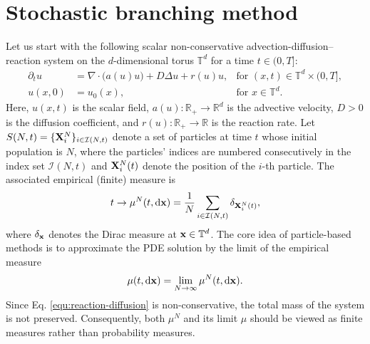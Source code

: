 \documentclass[a4paper,fleqn]{cas-sc}
\newcommand{\mhyphen}{\text{-}}
\theoremstyle{definition}
\theoremstyle{remark}
\begin{document}

\section{Stochastic branching method}
Let us start with the following scalar non-conservative advection-diffusion–reaction system on the $d$-dimensional torus $\mathbb{T}^d$ for a time $t \in (0, T]$:
\begin{subequations}\label{equ:reaction-diffusion}
\begin{align}
\partial_t u &= \nabla \!\cdot\! \big( a(u) u \big) + D \Delta u + r(u) u, & \text{for } (x, t) \in \mathbb{T}^d \times (0, T], \label{equ:pde} \\
u(x, 0) &= u_0(x), & \text{for } x \in \mathbb{T}^d. \label{equ:ic}
\end{align}
\end{subequations}
Here, $u(x,t)$ is the scalar field, $a(u): \mathbb{R}_{+} \to \mathbb{R}^d$ is the advective velocity, $D > 0$ is the diffusion coefficient, and $r(u): \mathbb{R}_{+} \to \mathbb{R}$ is the reaction rate.
Let $S(N,t)=\{\mathbf{X}^N_i\}_{i\in\mathcal I(N,t)}$ denote a set of particles at time $t$ whose initial population is $N$, where the particles' indices are numbered consecutively in the index set $\mathcal I(N,t)$ and $\mathbf{X}^N_i(t)$ denote the position of the $i\mhyphen$th particle. The associated empirical (finite) measure is
\begin{equation}
    t \to \mu^N(t,\mathrm{d} \mathbf{x}) =  \frac{1}{N}\sum_{i\in \mathcal I(N,t)}\delta_{\mathbf{X}^N_i(t)},
\end{equation}
where $\delta_{\mathbf{x}} $ denotes the Dirac measure at $\mathbf{x}\in \mathbb{T}^d$. The core idea of particle-based methods is to approximate the PDE solution by the limit of the empirical measure
\[
\mu(t,\mathrm{d}\mathbf{x}) = \lim_{N\to\infty} \mu^N(t,\mathrm{d}\mathbf{x}).
\]
Since Eq. \eqref{equ:reaction-diffusion} is non-conservative, the total mass of the system is not preserved. Consequently, both $\mu^N$ and its limit $\mu$ should be viewed as finite measures rather than probability measures.
\end{document}
